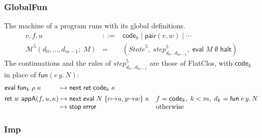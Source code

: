 \documentclass[10pt]{article}
\theoremstyle{acmplain}
\newcommand{\key}[1]{\mathsf{#1}}
\newcommand{\funref}[1]{\key{fun}_{#1}}
\newcommand{\ev}[3]{\key{eval}\;#1\;#2\;#3}
\newcommand{\rt}[2]{\key{ret}\;#1\;#2}
\newcommand{\nxt}{\key{next}\;}
\newcommand{\stp}{\key{stop}\;}
\newcommand{\error}{\key{error}}
\newcommand{\Mach}[1]{\mathcal{M}^{#1}}
\newcommand{\step}[1]{\mathit{step}^{#1}}
\newcommand{\pairV}[2]{\key{pair}(#1, #2)}
\newcommand{\funV}[1]{\key{fun}(#1)}
\newcommand{\codeV}[1]{\key{code}_{#1}}
\newcommand{\Kf}[2]{\key{#1}(#2)}
\newcommand{\halt}{\key{halt}}
\begin{document}
\subsubsection{GlobalFun}

The machine of a program runs with its global definitions.
\[
\begin{array}{rcl}
  v, f, u &::=& \codeV{k} \mid \pairV{v}{w} \mid \cdots \\
  \Mach{5}(d_0, \ldots, d_{m-1};\; M) &=& (\mathit{State}^{5},\; \step{5}_{d_0 \ldots d_{m-1}},\; \ev{M}{\emptyset}{\halt})
\end{array}
\]
The continuations and the rules of $\step{5}_{d_0 \ldots d_{m-1}}$ are those of FlatClos, with $\codeV{k}$ in place of $\funV{e\,y.\,N}$:
\[
\begin{array}{@{}l@{\;\mapsto\;}l@{\quad}l@{}}
  \ev{\funref{k}}{\rho}{\kappa} & \nxt \rt{\codeV{k}}{\kappa} \\[1ex]
  \rt{w}{\Kf{appA}{f, u, \kappa}} & \nxt \ev{N}{\{e {\mapsto} u, y {\mapsto} w\}}{\kappa}
    & f = \codeV{k},\; k < m,\; d_k = \key{fun}\; e\,y.\,N \\
  & \stp \error & \text{otherwise}
\end{array}
\]

\subsubsection{Imp}
\end{document}
